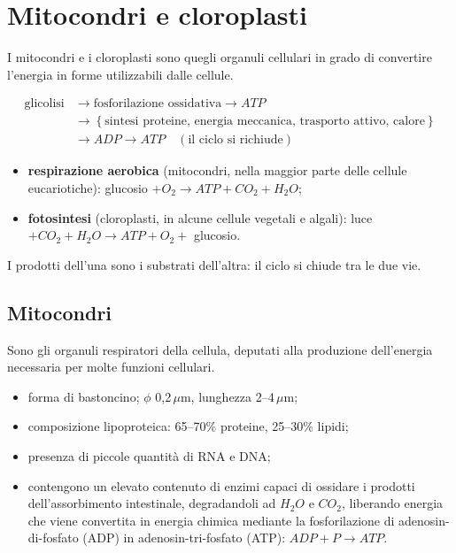 \section{Mitocondri e cloroplasti}

I mitocondri e i cloroplasti sono quegli organuli cellulari in grado di convertire l'energia in forme utilizzabili dalle cellule.

\[
\begin{aligned}
\text{glicolisi} &\rightarrow \text{fosforilazione ossidativa} \rightarrow ATP \\
&\rightarrow \left\{\text{sintesi proteine, energia meccanica, trasporto attivo, calore}\right\} \\
&\rightarrow ADP \rightarrow ATP \quad (\text{il ciclo si richiude})
\end{aligned}
\]

\begin{itemize}
  \item \textbf{respirazione aerobica} (mitocondri, nella maggior parte delle cellule eucariotiche): glucosio $+ O_2 \rightarrow ATP + CO_2 + H_2O$;
  \item \textbf{fotosintesi} (cloroplasti, in alcune cellule vegetali e algali): luce $+ CO_2 + H_2O \rightarrow ATP + O_2 + $ glucosio.
\end{itemize}
I prodotti dell'una sono i substrati dell'altra: il ciclo si chiude tra le due vie.

\subsection{Mitocondri}

Sono gli organuli respiratori della cellula, deputati alla produzione dell'energia necessaria per molte funzioni cellulari.

\begin{itemize}
  \item forma di bastoncino; $\phi$ 0,2\,$\mu$m, lunghezza 2--4\,$\mu$m;
  \item composizione lipoproteica: 65--70\% proteine, 25--30\% lipidi;
  \item presenza di piccole quantità di RNA e DNA;
  \item contengono un elevato contenuto di enzimi capaci di ossidare i prodotti dell'assorbimento intestinale, degradandoli ad $H_2O$ e $CO_2$, liberando energia che viene convertita in energia chimica mediante la fosforilazione di adenosin-di-fosfato (ADP) in adenosin-tri-fosfato (ATP): $ADP + P \rightarrow ATP$.
\end{itemize}

